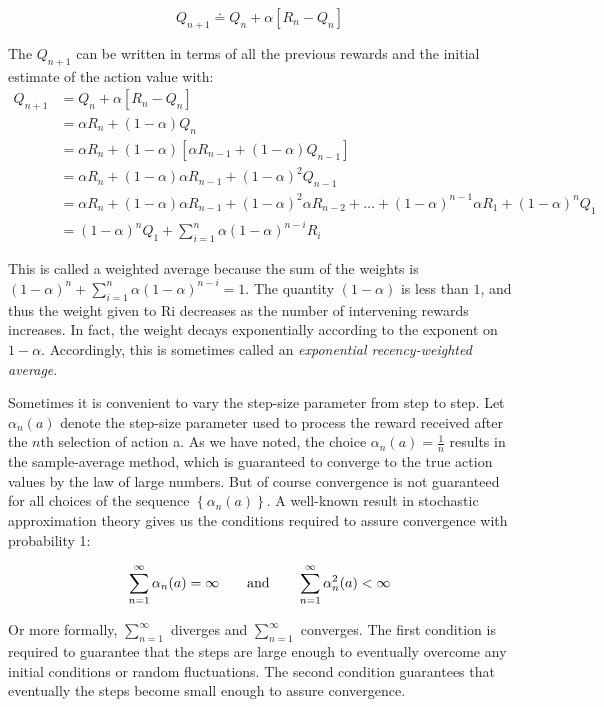 \begin{equation}
    Q_{n+1} \doteq Q_n + \alpha[R_n - Q_n]
\end{equation}

The $Q_{n+1}$ can be written in terms of all the previous rewards and the initial estimate of the action value with:
\begin{align*}
    Q_{n+1} &= Q_n + \alpha[R_n - Q_n] \\
    &= \alpha R_n + (1-\alpha)Q_n \\
    &= \alpha R_n + (1-\alpha)[\alpha R_{n-1} + (1-\alpha)Q_{n-1}] \\
    &= \alpha R_n + (1-\alpha)\alpha R_{n-1} + (1-\alpha)^2 Q_{n-1} \\
    &= \alpha R_n + (1-\alpha)\alpha R_{n-1} + (1-\alpha)^2\alpha R_{n-2} + \dots + (1-\alpha)^{n-1}\alpha R_1 + (1-\alpha)^nQ_1 \\
    &= (1-\alpha)^nQ_1 + \sum_{i=1}^{n}\alpha(1-\alpha)^{n-i}R_i
\end{align*}

This is called a weighted average because the sum of the weights is $(1-\alpha)^n+\sum_{i=1}^{n}\alpha(1-\alpha)^{n-i}=1$. The quantity $(1-\alpha)$ is less than $1$, and thus the weight given to Ri decreases as the number of intervening rewards increases. In fact, the weight decays exponentially according to the exponent on $1-\alpha$. Accordingly, this is sometimes called an \textit{exponential recency-weighted average}.

Sometimes it is convenient to vary the step-size parameter from step to step. Let $\alpha_n(a)$ denote the step-size parameter used to process the reward received after the $n$th selection of action a. As we have noted, the choice $\alpha_n(a) = \frac{1}{n}$ results in the sample-average method, which is guaranteed to converge to the true action values by the law of large numbers. But of course convergence is not guaranteed for all choices of the sequence $\left\{\alpha_n(a)\right\}$. A well-known result in stochastic approximation theory gives us the conditions required to assure convergence with probability 1:

\begin{equation}
    \sum_{n=1}^{\infty}\alpha_n(a) = \infty \quad\quad \text{and} \quad\quad \sum_{n=1}^{\infty}\alpha_n^2(a) < \infty\\
\end{equation}

Or more formally, $\sum_{n=1}^{\infty}$ diverges and $\sum_{n=1}^{\infty}$ converges. The first condition is required to guarantee that the steps are large enough to eventually overcome any initial conditions or random fluctuations. The second condition guarantees that eventually the steps become small enough to assure convergence.

